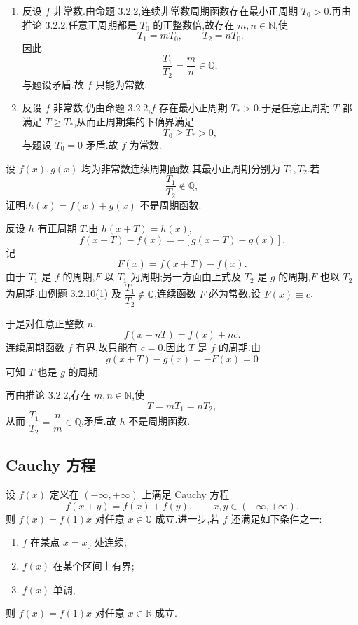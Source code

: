 \begin{solution}
    \leavevmode
    \begin{enumerate}
        \item 反设 $f$ 非常数.由命题 3.2.2,连续非常数周期函数存在最小正周期 $T_0>0$.再由推论 3.2.2,任意正周期都是 $T_0$ 的正整数倍,故存在 $m,n\in\mathbb{N}$,使
              \[
                  T_1=mT_0,\qquad T_2=nT_0.
              \]
              因此
              \[
                  \dfrac{T_1}{T_2}=\dfrac{m}{n}\in\mathbb{Q},
              \]
              与题设矛盾.故 $f$ 只能为常数.

        \item 反设 $f$ 非常数.仍由命题 3.2.2,$f$ 存在最小正周期 $T_*>0$.于是任意正周期 $T$ 都满足 $T\geq T_*$,从而正周期集的下确界满足
              \[
                  T_0\geq T_*>0,
              \]
              与题设 $T_0=0$ 矛盾.故 $f$ 为常数.
    \end{enumerate}
\end{solution}

\begin{example}
    设 $f(x),g(x)$ 均为非常数连续周期函数,其最小正周期分别为 $T_1,T_2$.若
    \[
        \dfrac{T_1}{T_2}\notin\mathbb{Q},
    \]
    证明:$h(x)=f(x)+g(x)$ 不是周期函数.
\end{example}
\exampleblank

\begin{solution}
    反设 $h$ 有正周期 $T$.由 $h(x+T)=h(x)$,
    \[
        f(x+T)-f(x)=-[g(x+T)-g(x)].
    \]
    记
    \[
        F(x)=f(x+T)-f(x).
    \]
    由于 $T_1$ 是 $f$ 的周期,$F$ 以 $T_1$ 为周期;另一方面由上式及 $T_2$ 是 $g$ 的周期,$F$ 也以 $T_2$ 为周期.由例题 3.2.10(1) 及 $\dfrac{T_1}{T_2}\notin\mathbb{Q}$,连续函数 $F$ 必为常数,设 $F(x)\equiv c$.

    于是对任意正整数 $n$,
    \[
        f(x+nT)=f(x)+nc.
    \]
    连续周期函数 $f$ 有界,故只能有 $c=0$.因此 $T$ 是 $f$ 的周期.由
    \[
        g(x+T)-g(x)=-F(x)=0
    \]
    可知 $T$ 也是 $g$ 的周期.

    再由推论 3.2.2,存在 $m,n\in\mathbb{N}$,使
    \[
        T=mT_1=nT_2,
    \]
    从而 $\dfrac{T_1}{T_2}=\dfrac{n}{m}\in\mathbb{Q}$,矛盾.故 $h$ 不是周期函数.
\end{solution}

\subsection{Cauchy 方程}

\begin{proposition}[\markstar]
    设 $f(x)$ 定义在 $(-\infty,+\infty)$ 上满足 Cauchy 方程
    \[
        f(x+y)=f(x)+f(y), \qquad x,y\in(-\infty,+\infty).
    \]
    则 $f(x)=f(1)x$ 对任意 $x\in\mathbb{Q}$ 成立.进一步,若 $f$ 还满足如下条件之一:
    \begin{enumerate}
        \item $f$ 在某点 $x=x_0$ 处连续;
        \item $f(x)$ 在某个区间上有界;
        \item $f(x)$ 单调,
    \end{enumerate}
    则 $f(x)=f(1)x$ 对任意 $x\in\mathbb{R}$ 成立.
\end{proposition}

